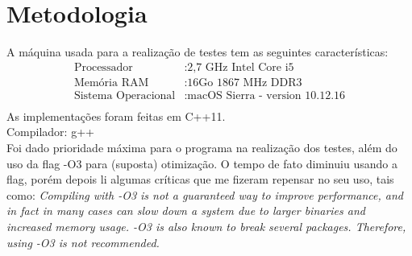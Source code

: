\section{Metodologia}
A máquina usada para a realização de testes tem as seguintes características:\\
\begin{align*}
	\text{Processador}&: \text{2,7 GHz Intel Core i5}\\
	\text{Memória RAM}&: \text{16Go 1867 MHz DDR3}\\
	\text{Sistema Operacional}&: \text{macOS Sierra - version 10.12.16}\\
\end{align*}
As implementações foram feitas em C++11.\\
Compilador: g++\\
Foi dado prioridade máxima para o programa na realização dos testes, além do uso da flag -O3 para (suposta) otimização. O tempo de fato diminuiu usando a flag, porém depois li algumas críticas que me fizeram repensar no seu uso, tais como: %
\textit{Compiling with -O3 is not a guaranteed way to improve performance, and in fact in many cases can slow down a system due to larger binaries and increased memory usage. -O3 is also known to break several packages. Therefore, using -O3 is not recommended.}
